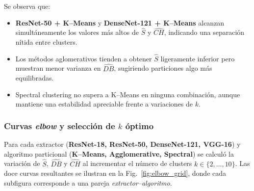 Se observa que:

\begin{itemize}
  \item \textbf{ResNet-50 + K–Means} y \textbf{DenseNet-121 + K–Means}
        alcanzan simultáneamente los valores más altos de \(\widehat S\) y
        \(\widehat{CH}\), indicando una separación nítida entre clusters.
  \item Los métodos aglomerativos tienden a obtener \(\widehat S\) ligeramente
        inferior pero muestran menor varianza en \(\widehat{DB}\),
        sugiriendo particiones algo más equilibradas.
  \item Spectral clustering no supera a K–Means en ninguna combinación,
        aunque mantiene una estabilidad apreciable frente a variaciones de \(k\).
\end{itemize}

\subsubsection{Curvas \emph{elbow} y selección de $k$ óptimo}

Para cada extractor (\textbf{ResNet-18, ResNet-50, DenseNet-121, VGG-16})
y algoritmo particional (\textbf{K–Means, Agglomerative, Spectral})
se calculó la variación de \(\widehat S\), \(\widehat{DB}\) y
\(\widehat{CH}\) al incrementar el número de clusters
\(k\in\{2,\dots,10\}\).
Las doce curvas resultantes se ilustran en la
Fig.~\ref{fig:elbow_grid}, donde cada subfigura corresponde a una pareja
\emph{extractor–algoritmo}.


